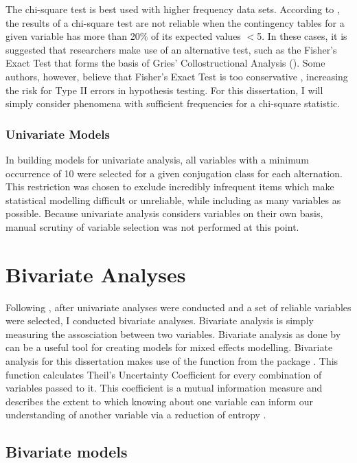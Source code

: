 The chi-square test is best used with higher frequency data sets. According to \citet{cochran1954some}, the results of a chi-square test are not reliable when the contingency tables for a given variable has more than 20\% of its expected values $<$5. In these cases, it is suggested that researchers make use of an alternative test, such as the Fisher's Exact Test that forms the basis of Gries' Collostructional Analysis (\citeyear{gries2004extending}). Some authors, however, believe that Fisher's Exact Test is too conservative \citep{dagostino}, increasing the risk for Type II errors in hypothesis testing. For this dissertation, I will simply consider phenomena with sufficient frequencies for a chi-square statistic.



\subsubsection{Univariate Models}
In building models for univariate analysis, all variables with a minimum occurrence of 10 were selected for a given conjugation class for each alternation. This restriction was chosen to exclude incredibly infrequent items which make statistical modelling difficult or unreliable, while including as many variables as possible. Because univariate analysis considers variables on their own basis, manual scrutiny of variable selection was not performed at this point. 

\section{Bivariate Analyses}
Following \citet{arppe2008univariate}, after univariate analyses were conducted and a set of reliable variables were selected, I conducted bivariate analyses. Bivariate analysis is simply measuring the assosciation between two variables. Bivariate analysis as done by \citet{arppe2008univariate} can be a useful tool for creating models for mixed effects modelling. Bivariate analysis for this dissertation makes use of the  function from the  package \citep{polytomous}. This function calculates Theil's Uncertainty Coefficient \citep{theil} for every combination of variables passed to it. This coefficient is a mutual information measure and describes the extent to which knowing about one variable can inform our understanding of another variable via a reduction of entropy \citep[90]{arppe2008univariate}. 


\subsection{Bivariate models}

